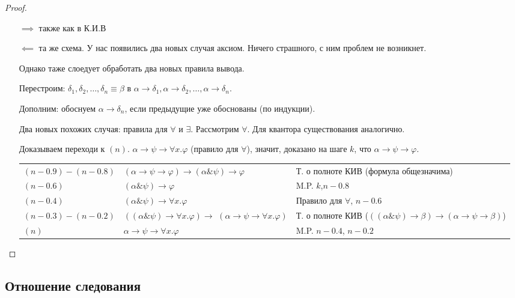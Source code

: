 \begin{proof}
    \begin{itemize}
        \item []
        \item [$\implies $] также как в К.И.В
        \item [$\impliedby $] та же схема. У нас появились два новых случая аксиом. Ничего страшного, с ним проблем не возникнет.

Однако таже слоедует обработать два новых правила вывода.

Перестроим: $\delta_1, \delta_2, \dots, \delta_n \equiv \beta$ в $\alpha\rightarrow\delta_1, \alpha\rightarrow\delta_2, \dots, \alpha\rightarrow\delta_n$.

Дополним: обоснуем $\alpha\rightarrow\delta_n$, если предыдущие уже обоснованы (по индукции).

Два новых похожих случая: правила для $\forall$ и $\exists$. Рассмотрим $\forall$. Для квантора существования аналогично.

Доказываем переходи к $(n)$. $\alpha\rightarrow\psi\rightarrow\forall x.\varphi$ (правило для $\forall$), значит, доказано
на шаге $k$, что $\alpha\rightarrow\psi\rightarrow\varphi$.

\begin{tabular}[t]{p{2.8cm} p{4.6cm} p{7cm}}
$(n-0.9)-(n-0.8)$ &
$(\alpha\rightarrow\psi\rightarrow\varphi)\rightarrow(\alpha\&\psi)\rightarrow\varphi$ & Т. о полноте КИВ (формула общезначима)\\
$(n-0.6)$ & $(\alpha \& \psi)\rightarrow\varphi$ & M.P. $k$,$n-0.8$\\
$(n-0.4)$ & $(\alpha \& \psi)\rightarrow\forall x.\varphi$ & Правило для $\forall$, $n-0.6$\\
\parbox{2.8cm}{$(n-0.3)-(n-0.2)$\\} & \parbox{4.6cm}{$((\alpha\&\psi)\rightarrow\forall x.\varphi)\rightarrow$\\$(\alpha\rightarrow\psi\rightarrow\forall x.\varphi)$} & \parbox{7cm}{Т. о полноте КИВ \\($((\alpha\&\psi)\rightarrow\beta)\rightarrow(\alpha\rightarrow\psi\rightarrow\beta)$)}\\
$(n)$ & $\alpha\rightarrow\psi\rightarrow\forall x.\varphi$ & M.P. $n-0.4$, $n-0.2$
\end{tabular}
    \end{itemize}
\end{proof}

\subsection{Отношение следования}

